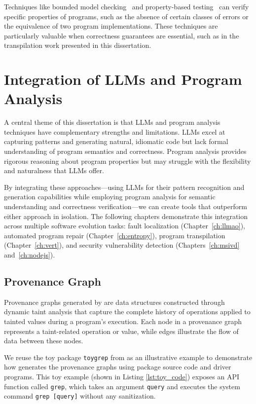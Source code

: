 \documentclass[12pt,openany,oneside,table]{cmuthesis}
\begin{document}
Techniques like bounded model checking~\cite{clarke2001bounded, DBLP:conf/tacas/ClarkeKL04} and property-based testing~\cite{fink1997property} can verify specific properties of programs, such as the absence of certain classes of errors or the equivalence of two program implementations. These techniques are particularly valuable when correctness guarantees are essential, such as in the transpilation work presented in this dissertation.

\section{Integration of LLMs and Program Analysis}

A central theme of this dissertation is that LLMs and program analysis techniques have complementary strengths and limitations. LLMs excel at capturing patterns and generating natural, idiomatic code but lack formal understanding of program semantics and correctness. Program analysis provides rigorous reasoning about program properties but may struggle with the flexibility and naturalness that LLMs offer.

By integrating these approaches—using LLMs for their pattern recognition and generation capabilities while employing program analysis for semantic understanding and correctness verification—we can create tools that outperform either approach in isolation. The following chapters demonstrate this integration across multiple software evolution tasks: fault localization (Chapter~\ref{ch:llmao}), automated program repair (Chapter~\ref{ch:entropy}), program transpilation (Chapter~\ref{ch:vert}), and security vulnerability detection (Chapters~\ref{ch:msivd} and~\ref{ch:nodejs}). 




\subsection{Provenance Graph}
\label{subsec:provenance-analysis}

Provenance graphs generated by \nodemedicfine are data structures constructed through dynamic taint analysis that capture the complete history of operations applied to tainted values during a program’s execution. 
Each node in a provenance graph represents a taint-related operation or value, while edges illustrate the flow of data between these nodes.

We reuse the toy package \texttt{toygrep} from \nodemedic{} \cite{cassel2023nodemedic} as an illustrative example to demonstrate how \nodemedic generates the provenance graphs using package source code and driver programs. This toy example (shown in Listing \ref{lst:toy_code}) exposes an API function called \texttt{grep}, which takes an argument \texttt{query} and executes the system command \texttt{grep [query]} without any sanitization.
\end{document}
